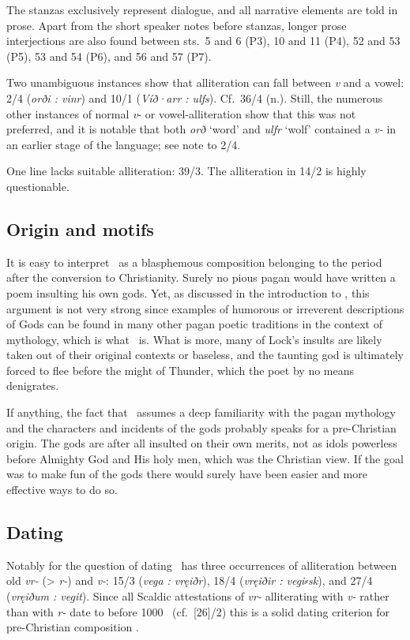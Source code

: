 The stanzas exclusively represent dialogue, and all narrative elements are told in prose.  Apart from the short speaker notes before stanzas, longer prose interjections are also found between sts.~5 and 6 (P3), 10 and 11 (P4), 52 and 53 (P5), 53 and 54 (P6), and 56 and 57 (P7).

Two unambiguous instances show that alliteration can fall between \emph{v} and a vowel: 2/4 (\emph{orði : vinr}) and 10/1 (\emph{Víð·arr : ulfs}).  Cf.~36/4 (n.).  Still, the numerous other instances of normal \emph{v}- or vowel-alliteration show that this was not preferred, and it is notable that both \emph{orð} ‘word’ and \emph{ulfr} ‘wolf’ contained a \emph{v-} in an earlier stage of the language; see note to 2/4.

One line lacks suitable alliteration: 39/3.  The alliteration in 14/2 is highly questionable.

\subsection{Origin and motifs}

It is easy to interpret \Lokasenna\ as a blasphemous composition belonging to the period after the conversion to Christianity.  Surely no pious pagan would have written a poem insulting his own gods.  Yet, as discussed in the introduction to , this argument is not very strong since examples of humorous or irreverent descriptions of Gods can be found in many other pagan poetic traditions in the context of mythology, which is what \Lokasenna\ is.  What is more, many of Lock’s insults are likely taken out of their original contexts or baseless, and the taunting god is ultimately forced to flee before the might of Thunder, which the poet by no means denigrates.

If anything, the fact that \Lokasenna\ assumes a deep familiarity with the pagan mythology and the characters and incidents of the gods probably speaks for a pre-Christian origin.  The gods are after all insulted on their own merits, not as idols powerless before Almighty God and His holy men, which was the Christian view.  If the goal was to make fun of the gods there would surely have been easier and more effective ways to do so.

\subsection{Dating}

Notably for the question of dating \Lokasenna\ has three occurrences of alliteration between old \emph{vr-} (> \emph{r-}) and \emph{v-}: 15/3 (\emph{vega : vręiðr}), 18/4 (\emph{vręiðir : vegi⸗sk}), and 27/4 (\emph{vręiðum : vegit}).
Since all Scaldic attestations of \emph{vr-} alliterating with \emph{v-} rather than with \emph{r-} date to before 1000 \ce\ (cf.~[26]/2) this is a solid dating criterion for pre-Christian composition \parencite{Haukur2016}.


